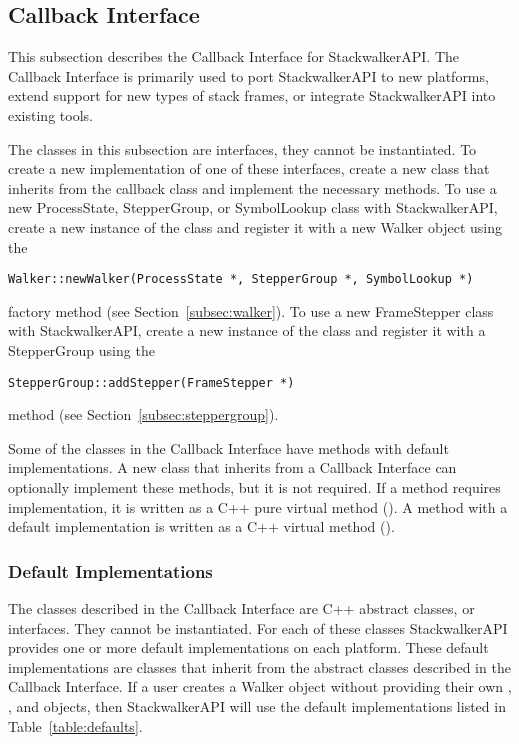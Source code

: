 \subsection{Callback Interface}
\label{sec:callback-interface}
This subsection describes the Callback Interface for StackwalkerAPI. The
Callback Interface is primarily used to port StackwalkerAPI to new platforms,
extend support for new types of stack frames, or integrate StackwalkerAPI into
existing tools.

The classes in this subsection are interfaces, they cannot be instantiated.  To
create a new implementation of one of these interfaces, create a new class that
inherits from the callback class and implement the necessary methods. To use a
new ProcessState, StepperGroup, or SymbolLookup class with StackwalkerAPI,
create a new instance of the class and register it with a new Walker object
using the
\begin{lstlisting}
Walker::newWalker(ProcessState *, StepperGroup *, SymbolLookup *)
\end{lstlisting}	
factory method (see Section~\ref{subsec:walker}). To use a new FrameStepper class with
StackwalkerAPI, create a new instance of the class and register it with a
StepperGroup using the
\begin{lstlisting}
StepperGroup::addStepper(FrameStepper *)
\end{lstlisting}
method (see Section~\ref{subsec:steppergroup}).

Some of the classes in the Callback Interface have methods with default
implementations. A new class that inherits from a Callback Interface can
optionally implement these methods, but it is not required. If a method requires
implementation, it is written as a C++ pure virtual method (). A method with a default implementation is written as a C++ virtual method
().

\subsubsection{Default Implementations}
\label{subsec:defaults}

The classes described in the Callback Interface are C++ abstract classes, or
interfaces. They cannot be instantiated. For each of these classes
StackwalkerAPI provides one or more default implementations on each platform.
These default implementations are classes that inherit from the abstract classes
described in the Callback Interface. If a user creates a Walker object without
providing their own , , and
 objects, then StackwalkerAPI will use the default
implementations listed in Table~\ref{table:defaults}.

